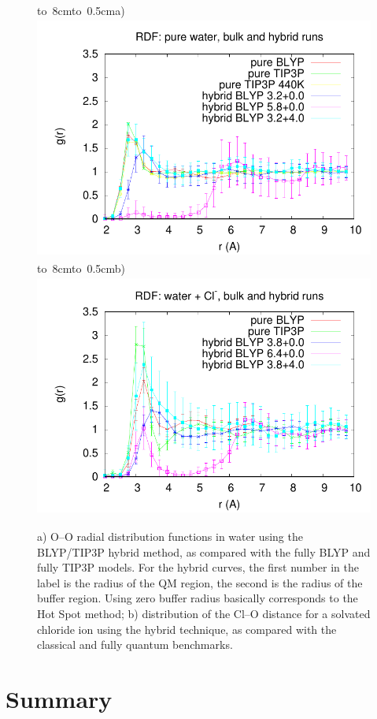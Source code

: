\documentclass[11pt]{revtex4}
\begin{document}
\begin{figure}
\hbox{\vbox to 8cm{\hbox to 0.5cm{a)}\vfil}\includegraphics[height=8cm]{summary_pure_water_rdfs_G}}
\hbox{\vbox to 8cm{\hbox to 0.5cm{b)}\vfil}\includegraphics[height=8cm]{summary_water_Cl_rdfs_G}}
\caption{a) O--O radial distribution functions in water using the BLYP/TIP3P hybrid method, as compared with the fully BLYP and fully TIP3P models. For the hybrid curves, the first number in the label is the radius of the QM region, the second is the radius of the buffer region. Using zero buffer radius basically corresponds to the Hot Spot method; b) distribution of the Cl--O distance for a solvated chloride ion using the hybrid technique, as compared with the classical and fully quantum benchmarks. }
\label{water_blyp_rdf}
\end{figure}
\section{Summary}
\end{document}
